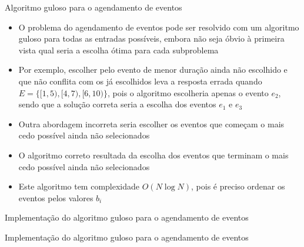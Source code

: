 \begin{frame}[fragile]{Algoritmo guloso para o agendamento de eventos}

    \begin{itemize}
        \item O problema do agendamento de eventos pode ser resolvido com um algoritmo guloso
            para todas as entradas possíveis, embora não seja óbvio à primeira vista qual seria
            a escolha ótima para cada subproblema

        \item Por exemplo, escolher pelo evento de menor duração ainda não escolhido e que não
            conflita com os já escolhidos leva a resposta errada quando $E = \lbrace 
                [1, 5), [4, 7), [6, 10)\rbrace$, pois o algoritmo escolheria apenas o evento 
            $e_2$, sendo que a solução correta seria a escolha dos eventos $e_1$ e $e_3$

        \item Outra abordagem incorreta seria escolher os eventos que começam o mais cedo possível
            ainda não selecionados

        \item O algoritmo correto resultada da escolha dos eventos que terminam o mais cedo
            possível ainda não selecionados

        \item Este algoritmo tem complexidade $O(N\log N)$, pois é preciso ordenar os eventos
            pelos valores $b_i$
    \end{itemize}

\end{frame}

\begin{frame}[fragile]{Implementação do algoritmo guloso para o agendamento de eventos}
\end{frame}

\begin{frame}[fragile]{Implementação do algoritmo guloso para o agendamento de eventos}
\end{frame}
